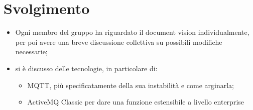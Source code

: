 \section{Svolgimento}

\begin{itemize}
    \item Ogni membro del gruppo ha riguardato il document vision individualmente, per poi avere una breve discussione collettiva su possibili modifiche necessarie;
    \item si è discusso delle tecnologie, in particolare di:
    \begin{itemize}
        \item MQTT, più specificatamente della sua instabilità e come arginarla;
        \item ActiveMQ Classic per dare una funzione estensibile a livello enterprise
    \end{itemize}
\end{itemize}